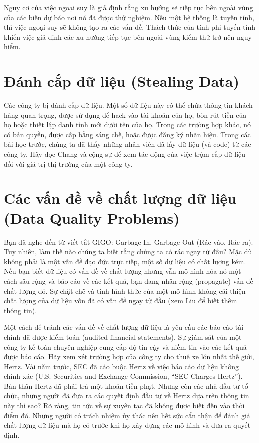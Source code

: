 Nguy cơ của việc ngoại suy là giả định rằng xu hướng sẽ tiếp tục bên ngoài vùng của các biến dự báo nơi nó đã được thử nghiệm. Nếu một hệ thống là tuyến tính, thì việc ngoại suy sẽ không tạo ra các vấn đề. Thách thức của tính phi tuyến tính khiến việc giả định các xu hướng tiếp tục bên ngoài vùng kiểm thử trở nên nguy hiểm.

\section{Đánh cắp dữ liệu (Stealing Data)}

Các công ty bị đánh cắp dữ liệu. Một số dữ liệu này có thể chứa thông tin khách hàng quan trọng, được sử dụng để hack vào tài khoản của họ, bòn rút tiền của họ hoặc thiết lập danh tính mới dưới tên của họ. Trong các trường hợp khác, nó có bản quyền, được cấp bằng sáng chế, hoặc được đăng ký nhãn hiệu. Trong các bài học trước, chúng ta đã thấy những nhân viên đã lấy dữ liệu (và code) từ các công ty. Hãy đọc Chang và cộng sự để xem tác động của việc trộm cắp dữ liệu đối với giá trị thị trường của một công ty.

\section{Các vấn đề về chất lượng dữ liệu (Data Quality Problems)}

Bạn đã nghe đến từ viết tắt GIGO: Garbage In, Garbage Out (Rác vào, Rác ra). Tuy nhiên, làm thế nào chúng ta biết rằng chúng ta có rác ngay từ đầu? Mặc dù không phải là một vấn đề đạo đức trực tiếp, một số dữ liệu có chất lượng kém. Nếu bạn biết dữ liệu có vấn đề về chất lượng nhưng vẫn mô hình hóa nó một cách sâu rộng và báo cáo về các kết quả, bạn đang nhân rộng (propagate) vấn đề chất lượng đó. Sự chặt chẽ và tính hình thức của một mô hình không cải thiện chất lượng của dữ liệu vốn đã có vấn đề ngay từ đầu (xem Liu để biết thêm thông tin).

Một cách để tránh các vấn đề về chất lượng dữ liệu là yêu cầu các báo cáo tài chính đã được kiểm toán (audited financial statements). Sự giám sát của một công ty kế toán chuyên nghiệp cung cấp độ tin cậy và niềm tin vào các kết quả được báo cáo. Hãy xem xét trường hợp của công ty cho thuê xe lớn nhất thế giới, Hertz. Vài năm trước, SEC đã cáo buộc Hertz về việc báo cáo dữ liệu không chính xác (U.S. Securities and Exchange Commission, ``SEC Charges Hertz''). Bản thân Hertz đã phải trả một khoản tiền phạt. Nhưng còn các nhà đầu tư tổ chức, những người đã đưa ra các quyết định đầu tư về Hertz dựa trên thông tin này thì sao? Rõ ràng, tin tức về sự xuyên tạc đã không được biết đến vào thời điểm đó. Những người có trách nhiệm ủy thác nên hết sức cẩn thận để đánh giá chất lượng dữ liệu mà họ có trước khi họ xây dựng các mô hình và đưa ra quyết định.

